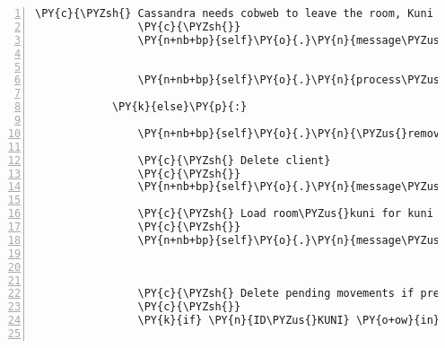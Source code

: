 \begin{Verbatim}[commandchars=\\\{\},numbers=left,firstnumber=1,stepnumber=1]
                \PY{c}{\PYZsh{} Cassandra needs cobweb to leave the room, Kuni is not allowed to leave}
                \PY{c}{\PYZsh{}}
                \PY{n+nb+bp}{self}\PY{o}{.}\PY{n}{message\PYZus{}for\PYZus{}host}\PY{o}{.}\PY{n}{event\PYZus{}list}\PY{o}{.}\PY{n}{append}\PY{p}{(}\PY{n}{fabula}\PY{o}{.}\PY{n}{PerceptionEvent}\PY{p}{(}\PY{n}{ID\PYZus{}KUNI}\PY{p}{,}
                                                                               \PY{l+s}{\PYZsq{}}\PY{l+s}{Du solltest vielleicht vorher Cassandra}\PY{l+s}{\PYZsq{}}
                                                                               \PY{l+s}{\PYZsq{}}\PY{l+s}{mit den Flügel helfen.}\PY{l+s}{\PYZsq{}}\PY{p}{)}\PY{p}{)}
                \PY{n+nb+bp}{self}\PY{o}{.}\PY{n}{process\PYZus{}TriesToMoveEvent}\PY{p}{(}\PY{n}{fabula}\PY{o}{.}\PY{n}{TriesToMoveEvent}\PY{p}{(}\PY{n}{ID\PYZus{}KUNI}\PY{p}{,}
                                                                      \PY{p}{(}\PY{l+m+mi}{5}\PY{p}{,} \PY{l+m+mi}{0}\PY{p}{)}\PY{p}{)}\PY{p}{)}
            \PY{k}{else}\PY{p}{:}

                \PY{n+nb+bp}{self}\PY{o}{.}\PY{n}{\PYZus{}remove\PYZus{}sentence}\PY{p}{(}\PY{n}{ID\PYZus{}KUNI}\PY{p}{,} \PY{l+s}{\PYZsq{}}\PY{l+s}{Die Tür zum Gnomenweg ist offen! Da gehts zum Zauberwald lang!}\PY{l+s}{\PYZsq{}}\PY{p}{)}

                \PY{c}{\PYZsh{} Delete client}
                \PY{c}{\PYZsh{}}
                \PY{n+nb+bp}{self}\PY{o}{.}\PY{n}{message\PYZus{}for\PYZus{}host}\PY{o}{.}\PY{n}{event\PYZus{}list}\PY{o}{.}\PY{n}{append}\PY{p}{(}\PY{n}{fabula}\PY{o}{.}\PY{n}{DeleteEvent}\PY{p}{(}\PY{n}{ID\PYZus{}KUNI}\PY{p}{)}\PY{p}{)}

                \PY{c}{\PYZsh{} Load room\PYZus{}kuni for kuni and spawn kuni at position (1, 1)}
                \PY{c}{\PYZsh{}}
                \PY{n+nb+bp}{self}\PY{o}{.}\PY{n}{message\PYZus{}for\PYZus{}host}\PY{o}{.}\PY{n}{event\PYZus{}list}\PY{o}{.}\PY{n}{extend}\PY{p}{(}\PY{n+nb+bp}{self}\PY{o}{.}\PY{n}{\PYZus{}load\PYZus{}room}\PY{p}{(}\PY{n}{ID\PYZus{}KUNI}\PY{p}{,}
                                                                        \PY{l+s}{\PYZdq{}}\PY{l+s}{room\PYZus{}kuni}\PY{l+s}{\PYZdq{}}\PY{p}{,}
                                                                        \PY{p}{(}\PY{l+m+mi}{1}\PY{p}{,} \PY{l+m+mi}{1}\PY{p}{)}\PY{p}{)}\PY{p}{)}

                \PY{c}{\PYZsh{} Delete pending movements if present}
                \PY{c}{\PYZsh{}}
                \PY{k}{if} \PY{n}{ID\PYZus{}KUNI} \PY{o+ow}{in} \PY{n+nb+bp}{self}\PY{o}{.}\PY{n}{tries\PYZus{}to\PYZus{}move\PYZus{}dict}\PY{o}{.}\PY{n}{keys}\PY{p}{(}\PY{p}{)}\PY{p}{:}


\end{Verbatim}
